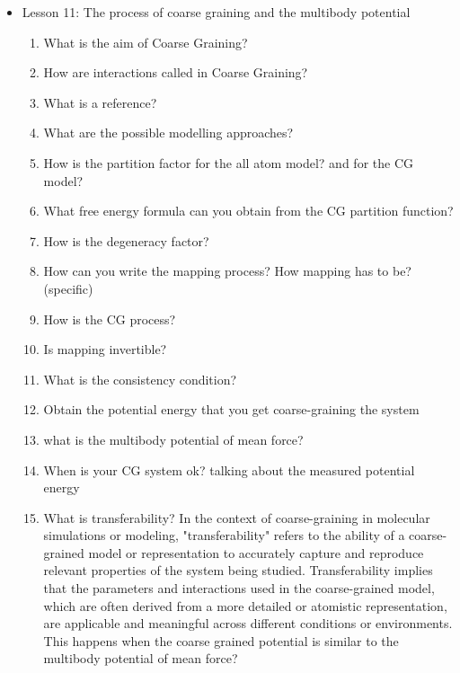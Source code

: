 {\begin{itemize}
\begin{enumerate}
        \item What is a projection operator?
        \item How are the partition function and the free energy after defocusing?
        \item What happens when you defocus your system in terms of entropy? And what free energy do you obtain?
        \item What happens to a correlation function at each step if not on a critical point? what if on a critical point?
    \end{enumerate}
    \item Lesson 11: The process of coarse graining and the multibody potential
    \begin{enumerate}
        \item What is the aim of Coarse Graining?
        \item How are interactions called in Coarse Graining?
        \item What is a reference?
        \item What are the possible modelling approaches?
        \item How is the partition factor for the all atom model? and for the CG model?
        \item What free energy formula can you obtain from the CG partition function?
        \item How is the degeneracy factor?
        \item How can you write the mapping process? How mapping has to be? (specific)
        \item How is the CG process?
        \item Is mapping invertible?
        \item What is the consistency condition?
        \item Obtain the potential energy that you get coarse-graining the system
        \item what is the multibody potential of mean force?
        \item When is your CG system ok? talking about the measured potential energy
        \item What is transferability? In the context of coarse-graining in molecular simulations or modeling, "transferability" refers to the ability of a coarse-grained model or representation to accurately capture and reproduce relevant properties of the system being studied. Transferability implies that the parameters and interactions used in the coarse-grained model, which are often derived from a more detailed or atomistic representation, are applicable and meaningful across different conditions or environments. This happens when the coarse grained potential is similar to the multibody potential of mean force?

\end{enumerate}
\end{itemize}}
